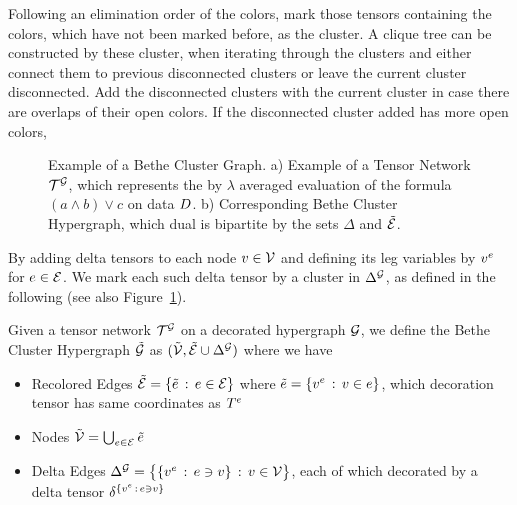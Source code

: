 

\begin{remark}
	Following an elimination order of the colors, mark those tensors containing the colors, which have not been marked before, as the cluster.
	A clique tree can be constructed by these cluster, when iterating through the clusters and either connect them to previous disconnected clusters or leave the current cluster disconnected.
	Add the disconnected clusters with the current cluster in case there are overlaps of their open colors.
	If the disconnected cluster added has more open colors, 
\end{remark}




\begin{figure}[h]
\begin{center}
	
\end{center}
\caption{Example of a Bethe Cluster Graph.
	a) Example of a Tensor Network $\mathcal{T}^{\mathcal{G}}$, which represents the by $\lambda$ averaged evaluation of the formula $(a\land b)\lor c$ on data $D$.
	b) Corresponding Bethe Cluster Hypergraph, which dual is bipartite by the sets $\Delta$ and $\tilde{\mathcal{E}}$.
	}
\label{fig:betheDataExample} 
\end{figure}

By adding delta tensors to each node $v\in\mathcal{V}$ and defining its leg variables by $v^{e}$ for $e\in\mathcal{E}$.
We mark each such delta tensor by a cluster in $\Delta^{\mathcal{G}}$, as defined in the following (see also Figure~\ref{fig:betheDataExample}).

\begin{definition}
	Given a tensor network $\mathcal{T}^{\mathcal{G}}$ on a decorated hypergraph $\mathcal{G}$, we define the Bethe Cluster Hypergraph $\tilde{\mathcal{G}}$ as
	$(\tilde{\mathcal{V}}, \tilde{\mathcal{E}} \cup \Delta^{\mathcal{G}})$ where we have
	\begin{itemize}
		\item Recolored Edges $\tilde{\mathcal{E}} = \{\tilde{e} \, : \, e\in \mathcal{E}\}$ where $\tilde{e} = \{v^{e} \, : \, v\in e\}$, which decoration tensor has same coordinates as $T^{e}$
		\item Nodes $\tilde{\mathcal{V}} = \bigcup_{e\in\mathcal{E}}\tilde{e}$ %
		\item Delta Edges $\Delta^{\mathcal{G}} =  \big\{ \{v^{e} \, : \, e\ni v \} \, : \, v\in\mathcal{V} \big\} $, each of which decorated by a delta tensor $\delta^{\{v^{e} \, : \, e\ni v \}}$
	\end{itemize}
\end{definition}

